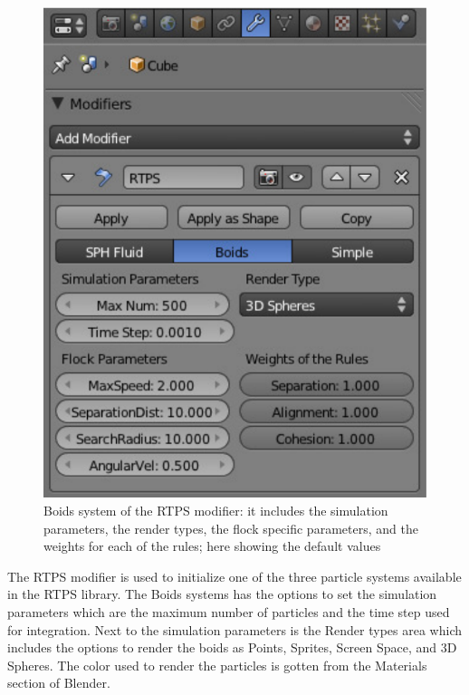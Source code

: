 \begin{figure}[htbp]
\begin{center}
\includegraphics[scale=0.8]{figures/modifier.pdf}
\caption{Boids system of the RTPS modifier: it includes the simulation parameters, the render types, the flock specific parameters, and the weights for each of the rules; here showing the default values}
\label{ui}
\end{center}
\end{figure}

The RTPS modifier is used to initialize one of the three particle systems available in the RTPS library. The Boids systems has the options to set the simulation parameters which are the maximum number of particles and the time step used for integration.  Next to the simulation parameters is the Render types area which includes the options to render the boids as Points, Sprites, Screen Space, and 3D Spheres. The color used to render the particles is gotten from the Materials section of Blender.

